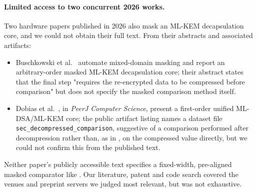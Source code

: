 \paragraph{Limited access to two concurrent 2026 works.} Two hardware papers published in 2026 also mask an ML-KEM decapsulation core, and we could not obtain their full text. From their abstracts and associated artifacts:
\begin{itemize}
  \item Buschkowski et al.~\cite{buschkowski2026} automate mixed-domain masking and report an arbitrary-order masked ML-KEM decapsulation core; their abstract states that the final step "requires the re-encrypted data to be compressed before comparison" but does not specify the masked comparison method itself.
  \item Dobias et al.~\cite{dobias2026}, in \emph{PeerJ Computer Science}, present a first-order unified ML-DSA/ML-KEM core; the public artifact listing names a dataset file \texttt{sec\_decompressed\_comparison}, suggestive of a comparison performed after decompression rather than, as in \PAMS{}, on the compressed value directly, but we could not confirm this from the published text.
\end{itemize}
Neither paper's publicly accessible text specifies a fixed-width, pre-aligned masked comparator like \PAMS{}. Our literature, patent and code search covered the venues and preprint servers we judged most relevant, but was not exhaustive.
